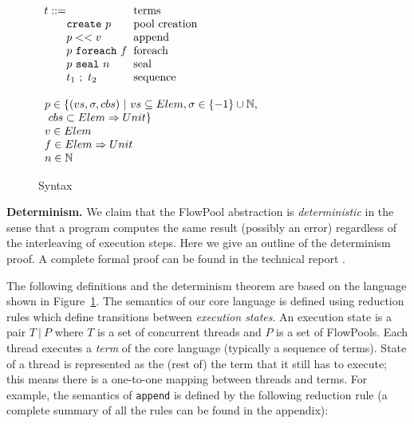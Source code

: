 \begin{figure}


\begin{minipage}[b]{7 cm}
$\ba[t]{l@{\hspace{2mm}}l}
t    ::=                                                           & \mbox{terms}              \\
\gap \texttt{create}~p                                   & \mbox{pool creation}  \\
\gap p << v                                                  & \mbox{append}           \\
\gap p~\texttt{foreach}~f                             & \mbox{foreach}           \\
\gap p~\texttt{seal}~n                                  & \mbox{seal}                \\
\gap t_1~;~t_2                                               & \mbox{sequence}        \\
\ea$
\end{minipage}
\begin{minipage}[b]{7 cm}
$\ba[t]{l@{\hspace{2mm}}l}
p \in \set{(vs, \sigma, cbs)~|~vs \subseteq Elem, \sigma \in \set{-1} \cup \mathbb{N}, \\
\text{ } cbs \subset Elem \Rightarrow Unit} \\
v \in Elem \\
f \in Elem \Rightarrow Unit \\
n \in \mathbb{N}
\ea$
\end{minipage}


\caption{Syntax}\label{fig:syntax}
\end{figure}

\textbf{Determinism.}
We claim that the FlowPool abstraction is
\emph{deterministic} in the sense that a program computes the same
result (possibly an error) regardless of the interleaving of
execution steps. Here we give an outline of the determinism
proof. A complete formal proof can be found in the technical report
\cite{Prokopec12}.

The following definitions and the determinism theorem are based on the
language shown in Figure~\ref{fig:syntax}. The semantics of our core
language is defined using reduction rules which define transitions
between \emph{execution states}. An execution state is a pair $T~|~P$
where $T$ is a set of concurrent threads and $P$ is a set of
FlowPools. Each thread executes a \emph{term} of the core language
(typically a sequence of terms).
State of a thread is represented as the (rest of)
the term that it still has to execute; this means there is a
one-to-one mapping between threads and terms.
For example, the semantics of \verb|append| is defined by the
following reduction rule (a complete summary of all the rules can be
found in the appendix):

